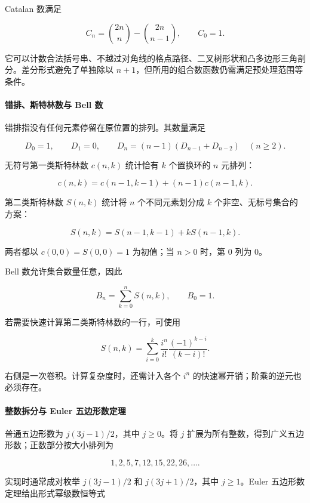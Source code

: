 Catalan 数满足

\[
C_n=\binom{2n}{n}-\binom{2n}{n-1},\qquad C_0=1.
\]

它可以计数合法括号串、不越过对角线的格点路径、二叉树形状和凸多边形三角剖分。差分形式避免了单独除以 \(n+1\)，但所用的组合数函数仍需满足预处理范围等条件。

\hypertarget{ux9519ux6392ux65afux7279ux6797ux6570ux4e0e-bell-ux6570}{%
\paragraph{错排、斯特林数与 Bell 数}\label{ux9519ux6392ux65afux7279ux6797ux6570ux4e0e-bell-ux6570}}

错排指没有任何元素停留在原位置的排列。其数量满足

\[
D_0=1,\qquad D_1=0,\qquad
D_n=(n-1)(D_{n-1}+D_{n-2})\quad(n\ge2).
\]

无符号第一类斯特林数 \(c(n,k)\) 统计恰有 \(k\) 个置换环的 \(n\) 元排列：

\[
c(n,k)=c(n-1,k-1)+(n-1)c(n-1,k).
\]

第二类斯特林数 \(S(n,k)\) 统计将 \(n\) 个不同元素划分成 \(k\) 个非空、无标号集合的方案：

\[
S(n,k)=S(n-1,k-1)+kS(n-1,k).
\]

两者都以 \(c(0,0)=S(0,0)=1\) 为初值；当 \(n>0\) 时，第 \(0\) 列为 \(0\)。

Bell 数允许集合数量任意，因此

\[
B_n=\sum_{k=0}^{n}S(n,k),\qquad B_0=1.
\]

若需要快速计算第二类斯特林数的一行，可使用

\[
S(n,k)=\sum_{i=0}^{k}\frac{i^n}{i!}\frac{(-1)^{k-i}}{(k-i)!}.
\]

右侧是一次卷积。计算复杂度时，还需计入各个 \(i^n\) 的快速幂开销；阶乘的逆元也必须存在。

\hypertarget{ux6574ux6570ux62c6ux5206ux4e0e-euler-ux4e94ux8fb9ux5f62ux6570ux5b9aux7406}{%
\paragraph{整数拆分与 Euler 五边形数定理}\label{ux6574ux6570ux62c6ux5206ux4e0e-euler-ux4e94ux8fb9ux5f62ux6570ux5b9aux7406}}

普通五边形数为 \(j(3j-1)/2\)，其中 \(j\ge0\)。将 \(j\) 扩展为所有整数，得到广义五边形数；正数部分按大小排列为

\[
1,2,5,7,12,15,22,26,\ldots.
\]

实现时通常成对枚举 \(j(3j-1)/2\) 和 \(j(3j+1)/2\)，其中 \(j\ge1\)。Euler 五边形数定理给出形式幂级数恒等式

